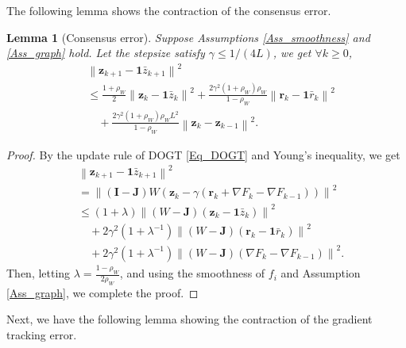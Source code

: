 \documentclass[10pt,a4paper]{amsart}
\newtheorem{Lem}{Lemma}
\begin{document}
The following lemma shows the contraction of the consensus error.

\begin{Lem}[Consensus error]\label{Lem_cons}
Suppose Assumptions \ref{Ass_smoothness} and \ref{Ass_graph} hold. Let the stepsize satisfy $\gamma \leqslant 1/\left( 4L \right) $, we get $\forall k \geqslant 0$,
\begin{equation}\label{Eq_consensus}
\begin{aligned}
&\left\| \mathbf{z}_{k+1}-\mathbf{1}\bar{z}_{k+1} \right\| ^2
\\
&\leqslant \frac{1+\rho _W}{2}\left\| \mathbf{z}_k-\mathbf{1}\bar{z}_k \right\| ^2+\frac{2\gamma ^2\left( 1+\rho _W \right) \rho _W}{1-\rho _W}\left\| \mathbf{r}_k-\mathbf{1}\bar{r}_k \right\| ^2
\\
&\quad+\frac{2\gamma ^2\left( 1+\rho _W \right) \rho _WL^2}{1-\rho _W}\left\| \mathbf{z}_k-\mathbf{z}_{k-1} \right\| ^2.
\end{aligned}
\end{equation}
\end{Lem}

\begin{proof}
By the update rule of DOGT \eqref{Eq_DOGT} and Young's inequality, we get
\begin{equation*}
\begin{aligned}
&\left\| \mathbf{z}_{k+1}-\mathbf{1}\bar{z}_{k+1} \right\| ^2
\\
&=\left\| \left( \mathbf{I}-\mathbf{J} \right) W\left( \mathbf{z}_k-\gamma \left( \mathbf{r}_k+\nabla F_k-\nabla F_{k-1} \right) \right) \right\| ^2
\\
&\leqslant \left( 1+\lambda \right) \left\| \left( W-\mathbf{J} \right) \left( \mathbf{z}_k-\mathbf{1}\bar{z}_k \right) \right\| ^2
\\
&\quad +2\gamma ^2\left( 1+\lambda ^{-1} \right) \left\| \left( W-\mathbf{J} \right) \left( \mathbf{r}_k-\mathbf{1}\bar{r}_k \right) \right\| ^2
\\
&\quad+2\gamma ^2\left( 1+\lambda ^{-1} \right) \left\| \left( W-\mathbf{J} \right) \left( \nabla F_k-\nabla F_{k-1} \right) \right\| ^2.
\end{aligned}
\end{equation*}
Then, letting $\lambda =\frac{1-\rho _W}{2\rho _W}$, and using the smoothness of $f_i$ and Assumption \ref{Ass_graph}, we complete the proof.
\end{proof}


Next, we have the following lemma showing the contraction of the gradient tracking error.
\end{document}
